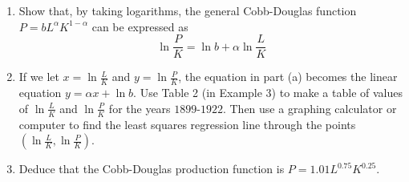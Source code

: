 \begin{exercise}
	{\color{white}{content...}}
	\renewcommand{\labelenumi}{(\alph{enumi})}
	\begin{enumerate}
		\item Show that, by taking logarithms, the general Cobb-Douglas function $P = bL^{\alpha}K^{1-\alpha}$ can be expressed as
		\begin{equation*}
		\ln \frac{P}{K} = \ln b + \alpha \ln \frac{L}{K}
		\end{equation*}
		\item If we let $x = \ln \frac{L}{K}$ and $y = \ln \frac{P}{K}$, the equation in part (a) becomes the linear equation $y = \alpha x + \ln b$. Use Table 2 (in Example 3) to make a table of values of $\ln \frac{L}{K}$ and $\ln \frac{P}{K}$ for the years $1899$-$1922$. Then use a graphing calculator or computer to find the least squares regression line through the points $\left( \ln \frac{L}{K}, \ln \frac{P}{K} \right)$.
		\item Deduce that the Cobb-Douglas production function is $P = 1.01L^{0.75}K^{0.25}$.
	\end{enumerate}
\end{exercise}